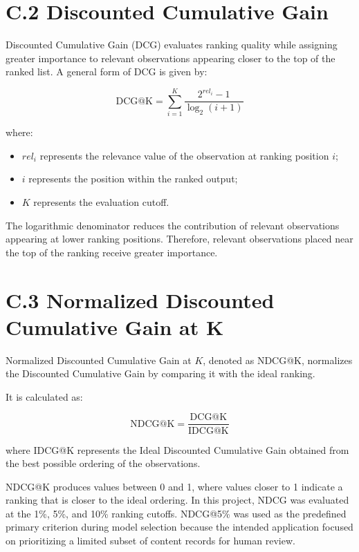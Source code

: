 \documentclass[12pt,a4paper]{report}
\begin{document}
\section*{C.2 Discounted Cumulative Gain}

Discounted Cumulative Gain (DCG) evaluates ranking quality while assigning greater importance to relevant observations appearing closer to the top of the ranked list. A general form of DCG is given by:

\begin{equation}
\text{DCG@K}
=
\sum_{i=1}^{K}
\frac{2^{rel_i}-1}
{\log_2(i+1)}
\end{equation}

where:

\begin{itemize}
    \item $rel_i$ represents the relevance value of the observation at ranking position $i$;
    \item $i$ represents the position within the ranked output;
    \item $K$ represents the evaluation cutoff.
\end{itemize}

The logarithmic denominator reduces the contribution of relevant observations appearing at lower ranking positions. Therefore, relevant observations placed near the top of the ranking receive greater importance.

\section*{C.3 Normalized Discounted Cumulative Gain at K}

Normalized Discounted Cumulative Gain at $K$, denoted as NDCG@K, normalizes the Discounted Cumulative Gain by comparing it with the ideal ranking.

It is calculated as:

\begin{equation}
\text{NDCG@K}
=
\frac{\text{DCG@K}}
{\text{IDCG@K}}
\end{equation}

where IDCG@K represents the Ideal Discounted Cumulative Gain obtained from the best possible ordering of the observations.

NDCG@K produces values between 0 and 1, where values closer to 1 indicate a ranking that is closer to the ideal ordering. In this project, NDCG was evaluated at the 1\%, 5\%, and 10\% ranking cutoffs. NDCG@5\% was used as the predefined primary criterion during model selection because the intended application focused on prioritizing a limited subset of content records for human review.
\end{document}
